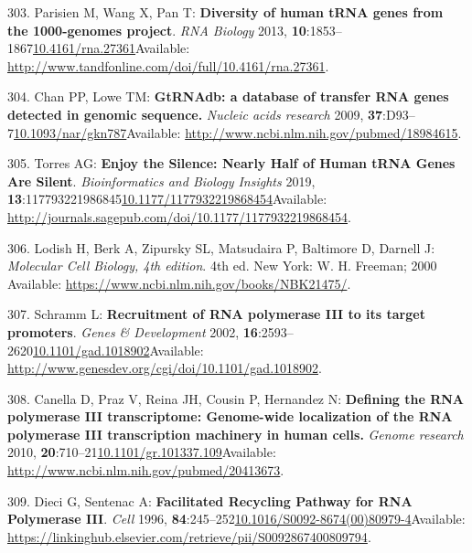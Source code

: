 \documentclass[
]{book}
\begin{document}
\leavevmode\hypertarget{ref-Parisien2013}{}%
303. Parisien M, Wang X, Pan T: \textbf{Diversity of human tRNA genes from the 1000-genomes project}. \emph{RNA Biology} 2013, \textbf{10}:1853--1867\href{https://doi.org/10.4161/rna.27361}{10.4161/rna.27361}Available: \url{http://www.tandfonline.com/doi/full/10.4161/rna.27361}.

\leavevmode\hypertarget{ref-Chan2009}{}%
304. Chan PP, Lowe TM: \textbf{GtRNAdb: a database of transfer RNA genes detected in genomic sequence.} \emph{Nucleic acids research} 2009, \textbf{37}:D93--7\href{https://doi.org/10.1093/nar/gkn787}{10.1093/nar/gkn787}Available: \url{http://www.ncbi.nlm.nih.gov/pubmed/18984615}.

\leavevmode\hypertarget{ref-Torres2019a}{}%
305. Torres AG: \textbf{Enjoy the Silence: Nearly Half of Human tRNA Genes Are Silent}. \emph{Bioinformatics and Biology Insights} 2019, \textbf{13}:117793221986845\href{https://doi.org/10.1177/1177932219868454}{10.1177/1177932219868454}Available: \url{http://journals.sagepub.com/doi/10.1177/1177932219868454}.

\leavevmode\hypertarget{ref-Lodish2000}{}%
306. Lodish H, Berk A, Zipursky SL, Matsudaira P, Baltimore D, Darnell J: \emph{Molecular Cell Biology, 4th edition}. 4th ed. New York: W. H. Freeman; 2000 Available: \url{https://www.ncbi.nlm.nih.gov/books/NBK21475/}.

\leavevmode\hypertarget{ref-Schramm2002}{}%
307. Schramm L: \textbf{Recruitment of RNA polymerase III to its target promoters}. \emph{Genes \& Development} 2002, \textbf{16}:2593--2620\href{https://doi.org/10.1101/gad.1018902}{10.1101/gad.1018902}Available: \url{http://www.genesdev.org/cgi/doi/10.1101/gad.1018902}.

\leavevmode\hypertarget{ref-Canella2010}{}%
308. Canella D, Praz V, Reina JH, Cousin P, Hernandez N: \textbf{Defining the RNA polymerase III transcriptome: Genome-wide localization of the RNA polymerase III transcription machinery in human cells.} \emph{Genome research} 2010, \textbf{20}:710--21\href{https://doi.org/10.1101/gr.101337.109}{10.1101/gr.101337.109}Available: \url{http://www.ncbi.nlm.nih.gov/pubmed/20413673}.

\leavevmode\hypertarget{ref-Dieci1996}{}%
309. Dieci G, Sentenac A: \textbf{Facilitated Recycling Pathway for RNA Polymerase III}. \emph{Cell} 1996, \textbf{84}:245--252\href{https://doi.org/10.1016/S0092-8674(00)80979-4}{10.1016/S0092-8674(00)80979-4}Available: \url{https://linkinghub.elsevier.com/retrieve/pii/S0092867400809794}.
\end{document}
